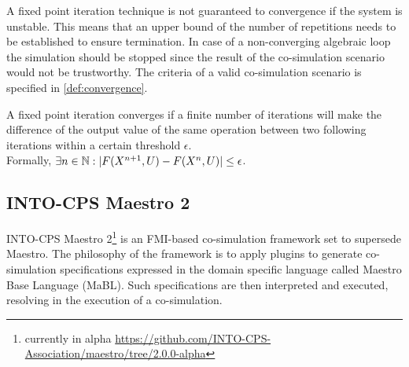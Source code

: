 
A fixed point iteration technique is not guaranteed to convergence if the system is unstable. This means that an upper bound of the number of repetitions needs to be established to ensure termination. In case of a non-converging algebraic loop the simulation should be stopped since the result of the co-simulation scenario would not be trustworthy. The criteria of a valid co-simulation scenario is specified in \cref{def:convergence}.

\begin{definition}\label{def:convergence}
A fixed point iteration converges if a finite number of iterations will make the difference of the output value of the same operation between two following iterations within a certain threshold $\epsilon$.\\
Formally, 
$\exists n \in \mathbb{N}: |F(X^{n+1}, U) - F(X^{n}, U)| \leq \epsilon$.
\end{definition}

\subsection{INTO-CPS Maestro 2}
INTO-CPS Maestro 2\footnote{currently in alpha \url{https://github.com/INTO-CPS-Association/maestro/tree/2.0.0-alpha}}\cite{Thule2019b} is an FMI-based co-simulation framework set to supersede Maestro\cite{Maestro}. The philosophy of the framework is to apply plugins to generate co-simulation specifications expressed in the domain specific language called Maestro Base Language (MaBL). Such specifications are then interpreted and executed, resolving in the execution of a co-simulation.